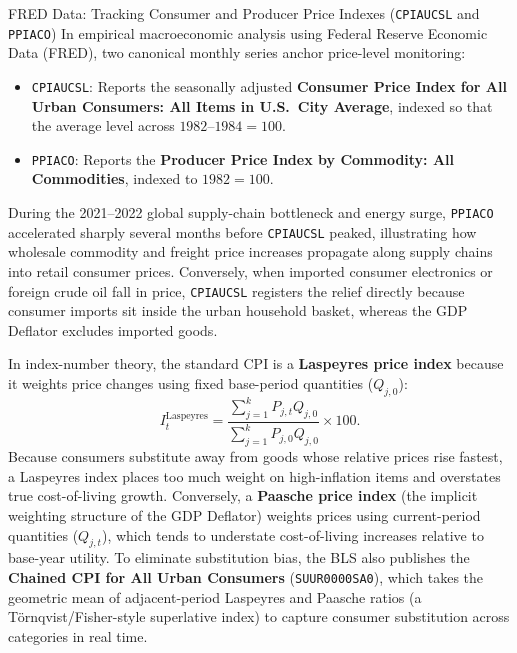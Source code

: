 \documentclass[11pt,letterpaper]{article}
\begin{document}
\begin{examplecase}{FRED Data: Tracking Consumer and Producer Price Indexes (\texttt{CPIAUCSL} and \texttt{PPIACO})}
In empirical macroeconomic analysis using Federal Reserve Economic Data (FRED), two canonical monthly series anchor price-level monitoring:
\begin{itemize}
    \item \texttt{CPIAUCSL}: Reports the seasonally adjusted \textbf{Consumer Price Index for All Urban Consumers: All Items in U.S.\ City Average}, indexed so that the average level across $1982\text{--}1984 = 100$.
    \item \texttt{PPIACO}: Reports the \textbf{Producer Price Index by Commodity: All Commodities}, indexed to $1982 = 100$.
\end{itemize}
During the 2021--2022 global supply-chain bottleneck and energy surge, \texttt{PPIACO} accelerated sharply several months before \texttt{CPIAUCSL} peaked, illustrating how wholesale commodity and freight price increases propagate along supply chains into retail consumer prices. Conversely, when imported consumer electronics or foreign crude oil fall in price, \texttt{CPIAUCSL} registers the relief directly because consumer imports sit inside the urban household basket, whereas the GDP Deflator excludes imported goods.
\end{examplecase}

\begin{casestudy}
In index-number theory, the standard CPI is a \textbf{Laspeyres price index} because it weights price changes using fixed base-period quantities ($Q_{j,0}$):
$$I_t^{\text{Laspeyres}} = \frac{\sum_{j=1}^{k} P_{j,t} Q_{j,0}}{\sum_{j=1}^{k} P_{j,0} Q_{j,0}} \times 100.$$
Because consumers substitute away from goods whose relative prices rise fastest, a Laspeyres index places too much weight on high-inflation items and overstates true cost-of-living growth. Conversely, a \textbf{Paasche price index} (the implicit weighting structure of the GDP Deflator) weights prices using current-period quantities ($Q_{j,t}$), which tends to understate cost-of-living increases relative to base-year utility. To eliminate substitution bias, the BLS also publishes the \textbf{Chained CPI for All Urban Consumers} (\texttt{SUUR0000SA0}), which takes the geometric mean of adjacent-period Laspeyres and Paasche ratios (a T\"ornqvist/Fisher-style superlative index) to capture consumer substitution across categories in real time.
\end{casestudy}
\end{document}
